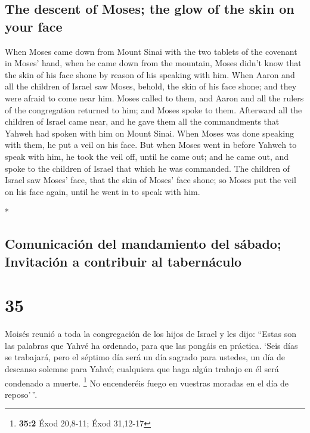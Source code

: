 \begin{paracol}{2}
\begin{otherlanguage}{english}
\hypertarget{the-descent-of-moses-the-glow-of-the-skin-on-your-face}{%
\subsection{The descent of Moses; the glow of the skin on your
face}\label{the-descent-of-moses-the-glow-of-the-skin-on-your-face}}

 When Moses came down from Mount Sinai with the two
tablets of the covenant in Moses' hand, when he came down from the
mountain, Moses didn't know that the skin of his face shone by reason of
his speaking with him.  When Aaron and all the children
of Israel saw Moses, behold, the skin of his face shone; and they were
afraid to come near him.  Moses called to them, and Aaron
and all the rulers of the congregation returned to him; and Moses spoke
to them.  Afterward all the children of Israel came near,
and he gave them all the commandments that Yahweh had spoken with him on
Mount Sinai.  When Moses was done speaking with them, he
put a veil on his face.  But when Moses went in before
Yahweh to speak with him, he took the veil off, until he came out; and
he came out, and spoke to the children of Israel that which he was
commanded.  The children of Israel saw Moses' face, that
the skin of Moses' face shone; so Moses put the veil on his face again,
until he went in to speak with him.

\end{otherlanguage}

\switchcolumn[0]*

\hypertarget{comunicaciuxf3n-del-mandamiento-del-suxe1bado-invitaciuxf3n-a-contribuir-al-tabernuxe1culo}{%
\subsection{Comunicación del mandamiento del sábado; Invitación a
contribuir al
tabernáculo}\label{comunicaciuxf3n-del-mandamiento-del-suxe1bado-invitaciuxf3n-a-contribuir-al-tabernuxe1culo}}

\hypertarget{section-68}{%
\section{35}\label{section-68}}

 Moisés reunió a toda la congregación de los hijos de
Israel y les dijo: ``Estas son las palabras que Yahvé ha ordenado, para
que las pongáis en práctica.  `Seis días se trabajará,
pero el séptimo día será un día sagrado para ustedes, un día de descanso
solemne para Yahvé; cualquiera que haga algún trabajo en él será
condenado a muerte. \footnote{\textbf{35:2} Éxod 20,8-11; Éxod 31,12-17}
 No encenderéis fuego en vuestras moradas en el día de
reposo'\,''.


\end{paracol}
